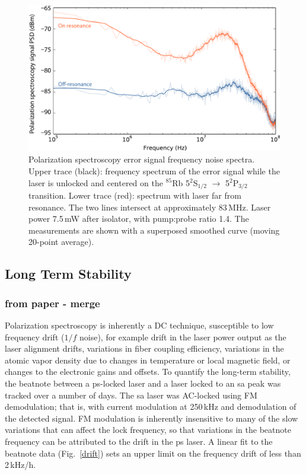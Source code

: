\begin{figure}[hbp]
    \centering
    \includegraphics[width=\linewidth]{chapter1/Figs/fig3_v1.pdf}
    \caption{Polarization spectroscopy error signal frequency noise spectra. Upper trace (black): frequency spectrum of the error signal while the laser is unlocked and centered on the $^{85}$Rb 5$^\text{2}$S$_\text{1/2}$ $\rightarrow$ 5$^\text{2}$P$_\text{3/2}$ transition.  Lower trace (red): spectrum with laser far from resonance. The two lines intersect at approximately 83\,MHz.  Laser power 7.5\,mW after isolator, with pump:probe ratio 1.4.  The measurements are shown with a superposed smoothed curve (moving 20-point average).}
    \label{bandwidth}
\end{figure}

\subsection{Long Term Stability}
\subsubsection{from paper - merge}
Polarization spectroscopy is inherently a DC technique, susceptible to low frequency drift ($1/f$ noise), for example drift in the laser power output as the laser alignment drifts, variations in fiber coupling efficiency, variations in the atomic vapor density due to changes in temperature or local magnetic field, or changes to the electronic gains and offsets.  To quantify the long-term stability, the beatnote between a \gls*{ps}-locked laser and a laser locked to an \gls*{sa} peak was tracked over a number of days.  The \gls*{sa} laser was AC-locked using FM demodulation; that is, with current modulation at 250\,kHz and demodulation of the detected signal.  FM modulation is inherently insensitive to many of the slow variations that can affect the lock frequency, so that variations in the beatnote frequency can be attributed to the drift in the \gls*{ps} laser. A linear fit to the beatnote data (Fig.~\ref{drift}) sets an upper limit on the frequency drift of less than 2\,kHz/h. 

